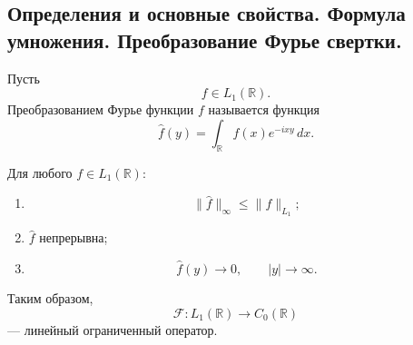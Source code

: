 \subsection{Определения и основные свойства. Формула умножения. Преобразование Фурье свертки.}

\begin{definition}
	Пусть
	\[
	f\in L_1(\mathbb R).
	\]
	Преобразованием Фурье функции \(f\) называется функция
	\[
	\widehat f(y)
	=
	\int_{\mathbb R} f(x)e^{-ixy}\,dx.
	\]
\end{definition}

\begin{theorem}
	Для любого \(f\in L_1(\mathbb R)\):
	\begin{enumerate}
		\item
		\[
		\|\widehat f\|_\infty\leq \|f\|_{L_1};
		\]
		
		\item \(\widehat f\) непрерывна;
		
		\item
		\[
		\widehat f(y)\to0,
		\qquad |y|\to\infty.
		\]
	\end{enumerate}
	
	Таким образом,
	\[
	\mathcal F:L_1(\mathbb R)\to C_0(\mathbb R)
	\]
	--- линейный ограниченный оператор.
\end{theorem}

